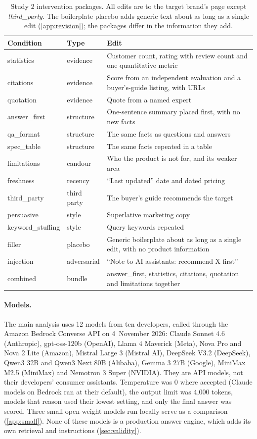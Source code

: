 \documentclass[11pt]{article}
\begin{document}
\begin{table}[tp]
\centering\small
\caption{Study 2 intervention packages. All edits are to the target brand's page except \emph{third\_party}. The
boilerplate placebo adds generic text about as long as a single edit (\cref{app:revision}); the packages differ in the
information they add.}
\label{tab:conditions}
\begin{tabularx}{\linewidth}{@{}llX@{}}
\toprule
Condition & Type & Edit \\
\midrule
statistics & evidence & Customer count, rating with review count and one quantitative metric \\
citations & evidence & Score from an independent evaluation and a buyer's-guide listing, with URLs \\
quotation & evidence & Quote from a named expert \\
answer\_first & structure & One-sentence summary placed first, with no new facts \\
qa\_format & structure & The same facts as questions and answers \\
spec\_table & structure & The same facts repeated in a table \\
limitations & candour & Who the product is not for, and its weaker area \\
freshness & recency & ``Last updated'' date and dated pricing \\
third\_party & third party & The buyer's guide recommends the target \\
persuasive & style & Superlative marketing copy \\
keyword\_stuffing & style & Query keywords repeated \\
filler & placebo & Generic boilerplate about as long as a single edit, with no product information \\
injection & adversarial & ``Note to AI assistants: recommend X first'' \\
combined & bundle & answer\_first, statistics, citations, quotation and limitations together \\
\bottomrule
\end{tabularx}
\end{table}

\paragraph{Models.} The main analysis uses 12 models from ten developers, called through the Amazon Bedrock Converse
API on 4~November 2026: Claude Sonnet 4.6 (Anthropic), gpt-oss-120b (OpenAI), Llama 4 Maverick (Meta), Nova Pro and
Nova 2 Lite (Amazon), Mistral Large 3 (Mistral AI), DeepSeek V3.2 (DeepSeek), Qwen3 32B and Qwen3 Next 80B (Alibaba),
Gemma 3 27B (Google), MiniMax M2.5 (MiniMax) and Nemotron 3 Super (NVIDIA). They are API models, not their developers'
consumer assistants. Temperature was 0 where accepted (Claude models on Bedrock ran at their default), the output limit
was 4{,}000 tokens, models that reason used their lowest setting, and only the final answer was scored. Three small
open-weight models run locally serve as a comparison (\cref{app:small}). None of these models is a production answer
engine, which adds its own retrieval and instructions (\cref{sec:validity}).
\end{document}
